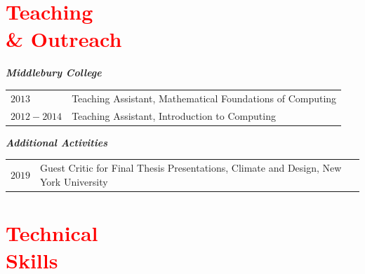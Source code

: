 \documentclass[margin, line]{res}
\begin{document}
\begin{resume}
	


\section{\sc \textcolor{Red}{\large{Teaching \\ \& Outreach}}}

\textit{\textbf{Middlebury College}}
\vspace*{0.05in}\\
\begin{tabular}{@{}p{1in}p{4in}}
$2013$ & Teaching Assistant, Mathematical Foundations of Computing \\
$2012 - 2014$ & Teaching Assistant, Introduction to Computing \\
\end{tabular}

\textit{\textbf{Additional Activities}}
\vspace*{0.05in}\\
\begin{tabular}{@{}p{1in}p{4in}}
$2019$ & Guest Critic for Final Thesis Presentations, Climate and Design, New York University \\


\end{tabular}


\section{\sc \textcolor{Red}{\large{Technical \\ Skills}}}
\vspace*{0.05in}
\begin{tabular}{@{}p{1in}p{4in}}


\end{tabular}
\end{resume}
\end{document}
